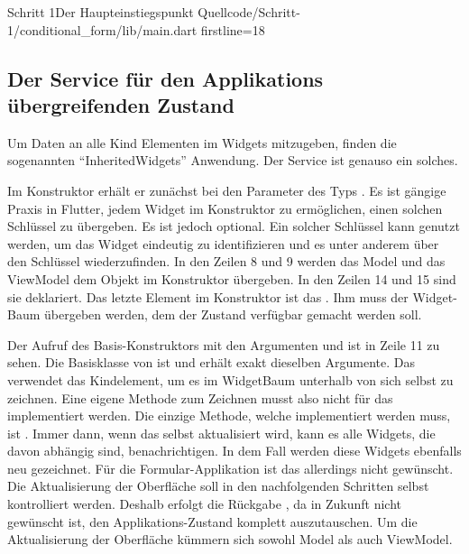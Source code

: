 \begin{alexlisting}{Schritt 1}{Der Haupteinstiegspunkt}
  {Quellcode/Schritt-1/conditional_form/lib/main.dart}
  {firstline=18}
  \label{lst:Schritt1DerHaupteinstiegspunkt}
\end{alexlisting}

\clearpage
\subsection{Der Service für den Applikations übergreifenden Zustand}

Um Daten an alle Kind Elementen im Widgets mitzugeben, finden die sogenannten \enquote{InheritedWidgets} Anwendung. Der Service  \Lst{\ref{lst:Schritt1DerServiceAppState}} ist genauso ein solches. 

Im Konstruktor erhält er zunächst bei den Parameter des Typs  . Es ist gängige Praxis in Flutter, jedem Widget im Konstruktor zu ermöglichen, einen solchen Schlüssel zu übergeben. Es ist jedoch optional.  Ein solcher Schlüssel kann genutzt werden, um das Widget eindeutig zu identifizieren und es unter anderem über den Schlüssel wiederzufinden. In den Zeilen 8 und 9 werden das Model und das ViewModel dem Objekt  im Konstruktor übergeben. In den Zeilen 14 und 15 sind sie deklariert. Das letzte Element im Konstruktor ist das . Ihm muss der Widget-Baum übergeben werden, dem der Zustand verfügbar gemacht werden soll.

Der Aufruf des Basis-Konstruktors mit den Argumenten  und  ist in Zeile 11 zu sehen. Die Basisklasse von  ist  und erhält exakt dieselben Argumente.  Das  verwendet das Kindelement, um es im WidgetBaum unterhalb von sich selbst zu zeichnen.  Eine eigene Methode zum Zeichnen musst also nicht für das  implementiert werden. Die einzige Methode, welche implementiert werden muss, ist  . Immer dann, wenn das  selbst aktualisiert wird, kann es alle Widgets, die davon abhängig sind, benachrichtigen.  In dem Fall werden diese  Widgets ebenfalls neu gezeichnet. Für die Formular-Applikation ist das allerdings nicht gewünscht. Die Aktualisierung der Oberfläche soll in den nachfolgenden Schritten selbst kontrolliert werden. Deshalb erfolgt die Rückgabe , da in Zukunft nicht gewünscht ist, den Applikations-Zustand komplett auszutauschen.  Um die  Aktualisierung  der Oberfläche  kümmern sich sowohl Model als auch ViewModel.

